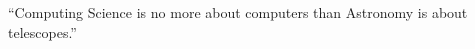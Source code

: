 
\setcounter{page}{0} %
\newpage
\thispagestyle{empty}

\renewcommand{\epigraphflush}{center} %
\renewcommand{\epigraphsize}{\large} %
\renewcommand{\textflush}{center} %
\setlength{\epigraphwidth}{0.6\textwidth} %

\epigraph{\vspace{8.55cm}``Computing Science is no more about computers than Astronomy is about telescopes.''}{\Dijkstra}

\renewcommand{\epigraphflush}{flushright}
\renewcommand{\epigraphsize}{\small}
\setlength{\epigraphwidth}{0.4\textwidth}
\renewcommand{\textflush}{flushleft}